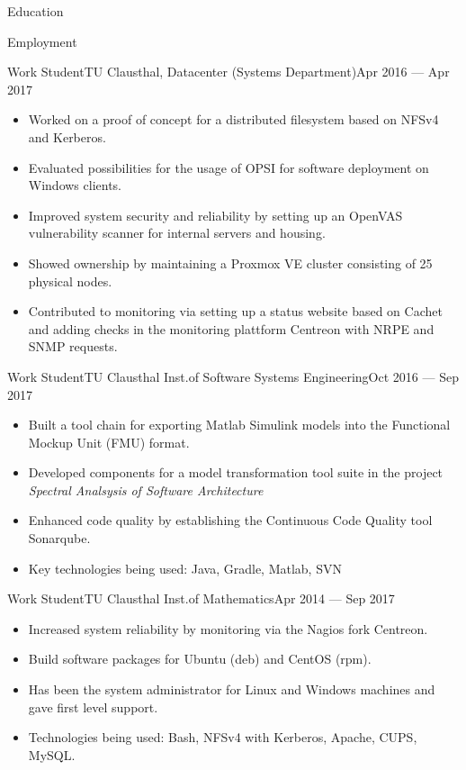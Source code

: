 \documentclass[]{mcdowellcv}
\begin{document}
\begin{cvsection}{Education}
\begin{cvsection}{Employment}
\begin{cvsubsection}{Work Student}{TU Clausthal, Datacenter (Systems Department)}{Apr 2016 --- Apr 2017}
\bigskip
\begin{itemize}
\item Worked on a proof of concept for a distributed filesystem based on NFSv4 and Kerberos.
\item Evaluated possibilities for the usage of OPSI for software deployment on Windows clients.
\item Improved system security and reliability by setting up an OpenVAS vulnerability scanner for internal servers and housing.
\item Showed ownership by maintaining a Proxmox VE cluster consisting of 25 physical nodes.
\item Contributed to monitoring via setting up a status website based on Cachet and adding checks in the monitoring plattform Centreon with NRPE and SNMP requests.
\end{itemize}
\end{cvsubsection}

\begin{cvsubsection}{Work Student}{TU Clausthal Inst.\@ of Software Systems Engineering}{Oct 2016 --- Sep 2017}
\bigskip
\begin{itemize}
\item Built a tool chain for exporting Matlab Simulink models into the Functional Mockup Unit (FMU) format.
\item Developed components for a model transformation tool suite in the project \emph{Spectral Analsysis of Software Architecture}
\item Enhanced code quality by establishing the Continuous Code Quality tool Sonarqube.
\item Key technologies being used: Java, Gradle, Matlab, SVN
\end{itemize}
\end{cvsubsection}

\begin{cvsubsection}{Work Student}{TU Clausthal Inst.\@ of Mathematics}{Apr 2014 --- Sep 2017}
\bigskip
\begin{itemize}
\item Increased system reliability by monitoring via the Nagios fork Centreon.
\item Build software packages for Ubuntu (deb) and CentOS (rpm).
\item Has been the system administrator for Linux and Windows machines and gave first level support.
\item Technologies being used: Bash, NFSv4 with Kerberos, Apache, CUPS, MySQL\@.
\end{itemize}
\end{cvsubsection}
\end{cvsection}


\end{cvsection}
\end{document}
